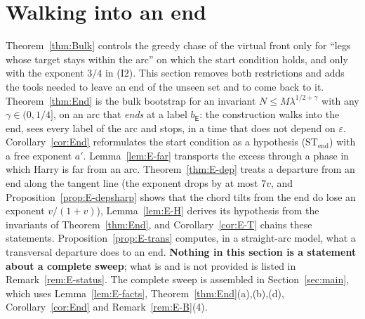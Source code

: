 
\newcommand{\Ee}{\mathsf E}
\newcommand{\EbE}{b_{\mathsf E}}
\newcommand{\EtE}{t_{\mathsf E}}
\newcommand{\EUE}{U_{\mathsf E}}
\newcommand{\Eu}{\hat u}
\newcommand{\EV}{\mathcal V}
\newcommand{\EA}{\mathcal A}
\newcommand{\ETL}{C_{\mathrm{TL}}}

\section{Walking into an end}\label{sec:end}

Theorem~\ref{thm:Bulk} controls the greedy chase of the virtual front only for ``legs whose target stays within the arc'' on which
the start condition holds, and only with the exponent $3/4$ in \textup{(I2)}. This section removes both restrictions and adds the
tools needed to leave an end of the unseen set and to come back to it. Theorem~\ref{thm:End} is the bulk bootstrap for an invariant
$N\le M\lambda^{1/2+\gamma}$ with any $\gamma\in(0,1/4]$, on an arc that \emph{ends} at a label $\EbE$: the construction walks into
the end, sees every label of the arc and stops, in a time that does not depend on $\varepsilon$. Corollary~\ref{cor:End} reformulates
the start condition as a hypothesis \textup{(ST$_{\mathrm{end}}$)} with a free exponent $a'$. Lemma~\ref{lem:E-far} transports the
excess through a phase in which Harry is far from an arc. Theorem~\ref{thm:E-dep} treats a departure from an end along the tangent
line (the exponent drops by at most $7v$, and Proposition~\ref{prop:E-depsharp} shows that the chord tilts from the end do lose an exponent $v/(1+v)$), Lemma~\ref{lem:E-H}
derives its hypothesis from the invariants of Theorem~\ref{thm:End}, and Corollary~\ref{cor:E-T} chains these statements.
Proposition~\ref{prop:E-trans} computes, in a straight-arc model, what a transversal departure does to an end. \textbf{Nothing in this
section is a statement about a complete sweep}; what is and is not provided is listed in Remark~\ref{rem:E-status}.
The complete sweep is assembled in Section~\ref{sec:main}, which uses Lemma~\ref{lem:E-facts}, Theorem~\ref{thm:End}(a),(b),(d),
Corollary~\ref{cor:End} and Remark~\ref{rem:E-B}(4).


